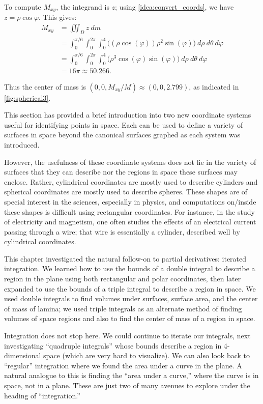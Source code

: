 \begin{example}
To compute $M_{xy}$, the integrand is $z$; using \autoref{idea:convert_coords}, we have $z = \rho\cos\varphi$. This gives:
\begin{align*}
M_{xy} &= \iiint_D z\ dm \\
	&= \int_0^{\pi/6}\int_0^{2\pi}\int_0^4 \bigl((\rho\cos(\varphi))\rho^2\sin(\varphi)\bigr) \ d\rho\ d\theta\ d\varphi\\
	&= \int_0^{\pi/6}\int_0^{2\pi}\int_0^4 \bigl(\rho^3\cos(\varphi)\sin(\varphi)\bigr) \ d\rho\ d\theta\ d\varphi\\
	&=16\pi \approx 50.266.
\end{align*}

Thus the center of mass is $(0,0,M_{xy}/M) \approx (0,0,2.799)$, as indicated in \autoref{fig:spherical3}.
\end{example}



This section has provided a brief introduction into two new coordinate systems useful for identifying points in space. Each can be used to define a variety of surfaces in space beyond the canonical surfaces graphed as each system was introduced.

However, the usefulness of these coordinate systems does not lie in the variety of surfaces that they can describe nor the regions in space these surfaces may enclose. Rather,  cylindrical coordinates are mostly used to describe cylinders and spherical coordinates are mostly used to describe spheres. These shapes are of special interest in the sciences, especially in physics, and computations on/inside these shapes is difficult using rectangular coordinates. For instance, in the study of electricity and magnetism, one often studies the effects of an electrical current passing through a wire; that wire is essentially a cylinder, described well by cylindrical coordinates.\bigskip

This chapter investigated the natural follow-on to partial derivatives: iterated integration. We learned how to use the bounds of a double integral to describe a region in the plane using both rectangular and polar coordinates, then later expanded to use the bounds of a triple integral to describe a region in space. We used double integrals to find volumes under surfaces, surface area, and the center of mass of lamina; we used triple integrals as an alternate method of finding volumes of space regions and also to find the center of mass of a region in space.

Integration does not stop here. We could continue to iterate our integrals, next investigating ``quadruple integrals'' whose bounds describe a region in 4-dimensional space (which are very hard to visualize). We can also look back to ``regular'' integration where we found the area under a curve in the plane. A natural analogue to this is finding the ``area under a curve,'' where the curve is in space, not in a plane. These are just two of many avenues to explore under the heading of ``integration.''

